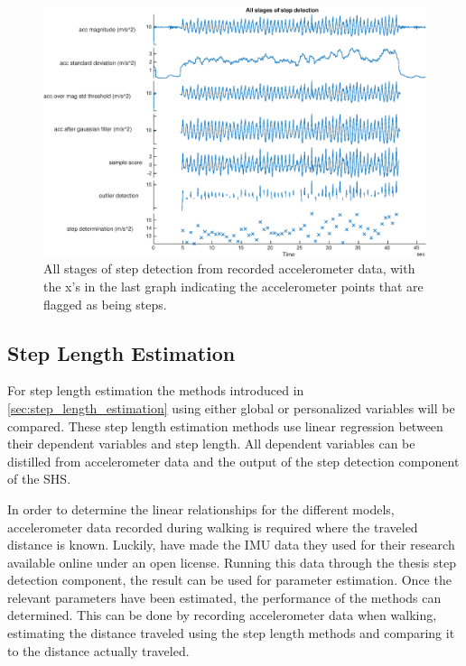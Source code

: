 \begin{figure}[H]
	\centering
	\includegraphics[width=1\linewidth]{images/20200924_1204_All_stages_of_step_detection}
	\caption[All stages of step detection ]{All stages of step detection from recorded accelerometer data, with the x's in the last graph indicating the accelerometer points that are flagged as being steps. }
	\label{fig:all_stages_of_step_detection}
\end{figure}

\subsection{Step Length Estimation}
For step length estimation the methods introduced in \cref{sec:step_length_estimation} using either global or personalized variables will be compared. These step length estimation methods use linear regression between their dependent variables and step length. All dependent variables can be distilled from accelerometer data and the output of the step detection component of the \ac{SHS}. \par 

In order to determine the linear relationships for the different models, accelerometer data recorded during walking is required where the traveled distance is known. Luckily, \cite{Vezocnik2019} have made the IMU data they used for their research available online under an open license. Running this data through the thesis step detection component, the result can be used for parameter estimation. Once the relevant parameters have been estimated, the performance of the methods can determined. This can be done by recording accelerometer data when walking, estimating the distance traveled using the step length methods and comparing it to the distance actually traveled.

